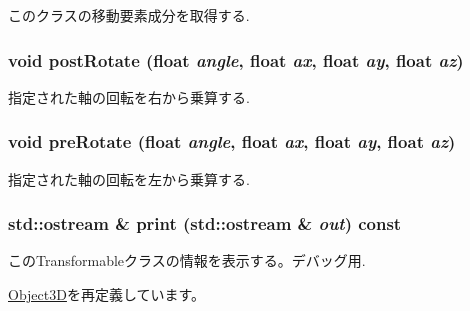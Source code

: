 このクラスの移動要素成分を取得する. \hypertarget{classm3g_1_1Transformable_4abf135257f132cdf9580f3a3e11ea6c}{
\subsubsection[{postRotate}]{\setlength{\rightskip}{0pt plus 5cm}void postRotate (float {\em angle}, \/  float {\em ax}, \/  float {\em ay}, \/  float {\em az})}}
\label{classm3g_1_1Transformable_4abf135257f132cdf9580f3a3e11ea6c}


指定された軸の回転を右から乗算する. \hypertarget{classm3g_1_1Transformable_718b606184672eec83263ad44d5c7431}{
\subsubsection[{preRotate}]{\setlength{\rightskip}{0pt plus 5cm}void preRotate (float {\em angle}, \/  float {\em ax}, \/  float {\em ay}, \/  float {\em az})}}
\label{classm3g_1_1Transformable_718b606184672eec83263ad44d5c7431}


指定された軸の回転を左から乗算する. \hypertarget{classm3g_1_1Transformable_6fea17fa1532df3794f8cb39cb4f911f}{
\subsubsection[{print}]{\setlength{\rightskip}{0pt plus 5cm}std::ostream \& print (std::ostream \& {\em out}) const}}
\label{classm3g_1_1Transformable_6fea17fa1532df3794f8cb39cb4f911f}


このTransformableクラスの情報を表示する。デバッグ用. 

\hyperlink{classm3g_1_1Object3D_6fea17fa1532df3794f8cb39cb4f911f}{Object3D}を再定義しています。

